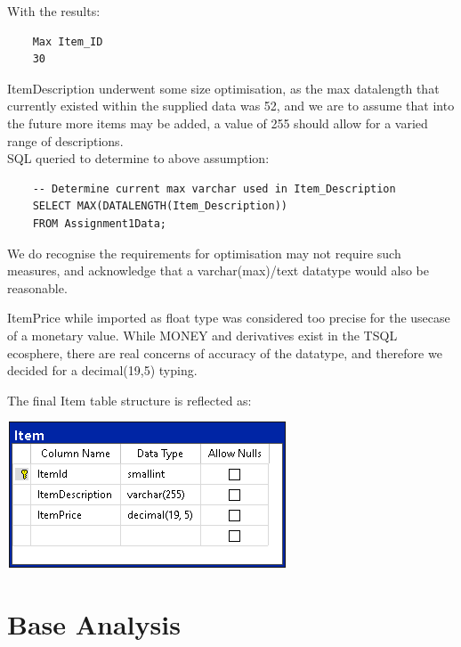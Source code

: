 \documentclass{article}
\begin{document}
                With the results:
                \begin{verbatim}
    Max Item_ID
    30
                \end{verbatim}
                ItemDescription underwent some size optimisation, as the max datalength 
                that currently existed within the supplied data was 52, and we are to assume
                that into the future more items may be added, a value of 255 should allow
                for a varied range of descriptions.
                \\
                SQL queried to determine to above assumption:
                \begin{verbatim}
    -- Determine current max varchar used in Item_Description
    SELECT MAX(DATALENGTH(Item_Description)) 
    FROM Assignment1Data;
                \end{verbatim}
                We do recognise the requirements for optimisation may not require such measures, and 
                acknowledge that a varchar(max)/text datatype would also be reasonable.
                \vspace{5mm}
                \par\noindent
                ItemPrice while imported as float type was considered too precise for the usecase of 
                a monetary value. While MONEY and derivatives exist in the TSQL ecosphere, there are 
                real concerns of accuracy of the datatype\cite{MoneyIssues}, and therefore we decided for 
                a decimal(19,5) typing\cite{Numeric}.
                \vspace{5mm}
                \par\noindent
                The final Item table structure is reflected as:
                \begin{center}
                    \includegraphics{Images/Item_Table.png}
                \end{center}
    \newpage
    \section{Base Analysis}
    \label{sec:BA}
\end{document}

